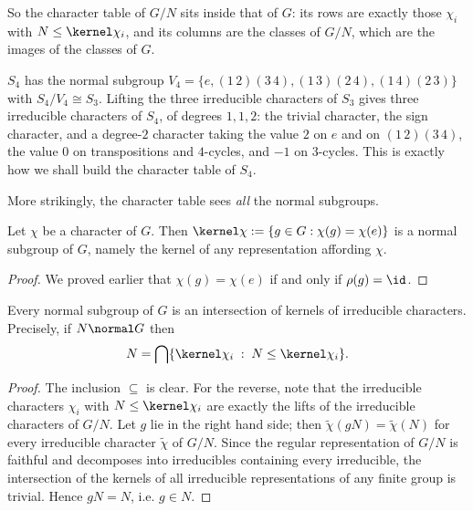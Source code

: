 \begin{center}
\end{center}

So the character table of $G/N$ sits inside that of $G$: its rows are exactly those $\chi_i$ with $N \leq \kernel\chi_i$, and its columns are the classes of $G/N$, which are the images of the classes of $G$.

\begin{example}
	$S_4$ has the normal subgroup $V_4 = \{e, (1\,2)(3\,4), (1\,3)(2\,4), (1\,4)(2\,3)\}$ with $S_4/V_4 \cong S_3$. Lifting the three irreducible characters of $S_3$ gives three irreducible characters of $S_4$, of degrees $1, 1, 2$: the trivial character, the sign character, and a degree-$2$ character taking the value $2$ on $e$ and on $(1\,2)(3\,4)$, the value $0$ on transpositions and $4$-cycles, and $-1$ on $3$-cycles. This is exactly how we shall build the character table of $S_4$.
\end{example}

More strikingly, the character table sees \emph{all} the normal subgroups.

\begin{proposition}
	Let $\chi$ be a character of $G$. Then $\kernel\chi := \{g \in G : \chi(g) = \chi(e)\}$ is a normal subgroup of $G$, namely the kernel of any representation affording $\chi$.
\end{proposition}
\begin{proof}
	We proved earlier that $\chi(g) = \chi(e)$ if and only if $\rho(g) = \id$.
\end{proof}

\begin{theorem}
	Every normal subgroup of $G$ is an intersection of kernels of irreducible characters. Precisely, if $N \normal G$ then
	$$N = \bigcap \{\kernel\chi_i \; : \; N \leq \kernel \chi_i\}.$$
\end{theorem}
\begin{proof}
	The inclusion $\subseteq$ is clear. For the reverse, note that the irreducible characters $\chi_i$ with $N \leq \kernel\chi_i$ are exactly the lifts of the irreducible characters of $G/N$. Let $g$ lie in the right hand side; then $\tilde\chi(gN) = \tilde\chi(N)$ for every irreducible character $\tilde\chi$ of $G/N$. Since the regular representation of $G/N$ is faithful and decomposes into irreducibles containing every irreducible, the intersection of the kernels of all irreducible representations of any finite group is trivial. Hence $gN = N$, i.e. $g \in N$.
\end{proof}


